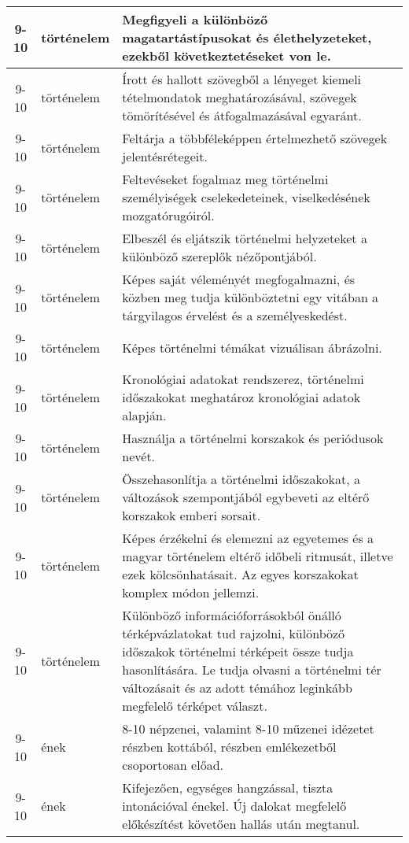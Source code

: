 \begin{small}
\begin{longtable}{c | p{2cm} |  p{11cm} }
              9-10 & történelem & Megfigyeli a különböző magatartástípusokat és élethelyzeteket, ezekből következtetéseket von le. \\ \hline
              9-10 & történelem & Írott és hallott szövegből a lényeget kiemeli tételmondatok meghatározásával, szövegek tömörítésével és átfogalmazásával egyaránt. \\ \hline
              9-10 & történelem & Feltárja a többféleképpen értelmezhető szövegek jelentésrétegeit. \\ \hline
              9-10 & történelem & Feltevéseket fogalmaz meg történelmi személyiségek cselekedeteinek, viselkedésének mozgatórugóiról. \\ \hline
              9-10 & történelem & Elbeszél és eljátszik történelmi helyzeteket a különböző szereplők nézőpontjából. \\ \hline
              9-10 & történelem & Képes saját véleményét megfogalmazni, és közben meg tudja különböztetni egy vitában a tárgyilagos érvelést és a személyeskedést. \\ \hline
              9-10 & történelem & Képes történelmi témákat vizuálisan ábrázolni. \\ \hline
              9-10 & történelem & Kronológiai adatokat rendszerez, történelmi időszakokat meghatároz kronológiai adatok alapján. \\ \hline
              9-10 & történelem & Használja a történelmi korszakok és periódusok nevét. \\ \hline
              9-10 & történelem & Összehasonlítja a történelmi időszakokat, a változások szempontjából egybeveti az eltérő korszakok emberi sorsait. \\ \hline
              9-10 & történelem & Képes érzékelni és elemezni az egyetemes és a magyar történelem eltérő időbeli ritmusát, illetve ezek kölcsönhatásait. Az egyes korszakokat komplex módon jellemzi. \\ \hline
              9-10 & történelem & Különböző információforrásokból önálló térképvázlatokat tud rajzolni, különböző időszakok történelmi térképeit össze tudja hasonlítására. Le tudja olvasni a történelmi tér változásait és az adott témához leginkább megfelelő térképet választ. \\ \hline
              9-10 & ének & 8-10 népzenei, valamint 8-10 műzenei idézetet részben kottából, részben emlékezetből csoportosan előad. \\ \hline
              9-10 & ének & Kifejezően, egységes hangzással, tiszta intonációval énekel. Új dalokat megfelelő előkészítést követően hallás után megtanul. \\ \hline

\end{longtable}
\end{small}

